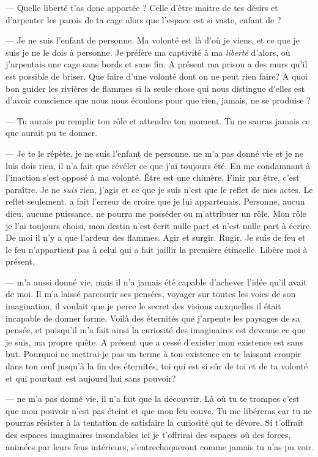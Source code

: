 --- Quelle liberté t'as donc apportée \auga? Celle d'être maitre de tes désirs et d'arpenter les parois de ta cage alors que l'espace est si vaste, enfant de \Mey?\n

--- Je ne suis l'enfant de personne. Ma volonté est là d'où je viens, et ce que je suis je ne le dois à personne. Je préfère ma captivité à ma \textit{liberté} d'alors, où j'arpentais une cage sans bords et sans fin. A présent ma prison a des murs qu'il est possible de briser. Que faire d'une volonté dont on ne peut rien faire? A quoi bon guider les rivières de flammes si la seule chose qui nous distingue d'elles est d'avoir conscience que nous nous écoulons pour que rien, jamais, ne se produise ?\n

--- Tu aurais pu remplir ton rôle et attendre ton moment. Tu ne sauras jamais ce que \Mey aurait pu te donner. \n

--- Je te le répète, je ne suis l'enfant de personne. \Mey ne m'a pas donné vie et je ne luis dois rien, il n'a fait que révéler ce que j'ai toujours été. En me condamnant à l'inaction \Mey s'est opposé à ma volonté. Être est une chimère. Finir par être, c'est paraître. Je ne \textit{suis} rien, j'agis et ce que je suis n'est que le reflet de mes actes. Le reflet seulement. \Mey a fait l'erreur de croire que je lui appartenais. Personne, aucun dieu, aucune puissance, ne pourra me posséder ou m'attribuer un rôle. Mon rôle je l'ai toujours choisi, mon destin n'est écrit nulle part et n'est nulle part à écrire. De moi il n'y a que l'ardeur des flammes. Agir et surgir. Rugir. Je suis de feu et le feu n'appartient pas à celui qui a fait jaillir la première étincelle. Libère moi à présent.

--- \Mey m'a aussi donné vie, mais il n'a jamais été capable d'achever l'idée qu'il avait de moi. Il m'a laissé parcourir ses pensées, voyager sur toutes les voies de son imagination, il voulait que je perce le secret des visions auxquelles il était incapable de donner forme. Voilà des éternités que j'arpente les paysages de sa pensée, et puisqu'il m'a fait ainsi la curiosité des imaginaires est devenue ce que je suis, ma propre quête. A présent que \Mey a cessé d'exister mon existence est sans but. Pourquoi ne mettrai-je pas un terme à ton existence en te laissant croupir dans ton œuf jusqu'à la fin des éternités, toi qui est si sûr de toi et de ta volonté et qui pourtant est aujourd'hui sans pouvoir?

--- \Mey ne m'a pas donné vie, il n'a fait que la découvrir. Là où tu te trompes c'est que mon pouvoir n'est pas éteint et que mon feu couve. Tu me libéreras car tu ne pourras résister à la tentation de satisfaire la curiosité qui te dévore. Si \Mey t'offrait des espaces imaginaires insondables ici je t'offrirai des espaces où des forces, animées par leurs feus intérieurs, s'entrechoqueront comme jamais tu n'as pu voir.

